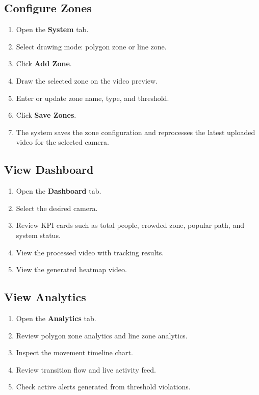 \documentclass[12pt,a4paper]{report}
\begin{document}
\subsection{Configure Zones}

\begin{enumerate}
    \item Open the \textbf{System} tab.
    \item Select drawing mode: polygon zone or line zone.
    \item Click \textbf{Add Zone}.
    \item Draw the selected zone on the video preview.
    \item Enter or update zone name, type, and threshold.
    \item Click \textbf{Save Zones}.
    \item The system saves the zone configuration and reprocesses the latest uploaded video for the selected camera.
\end{enumerate}

\subsection{View Dashboard}

\begin{enumerate}
    \item Open the \textbf{Dashboard} tab.
    \item Select the desired camera.
    \item Review KPI cards such as total people, crowded zone, popular path, and system status.
    \item View the processed video with tracking results.
    \item View the generated heatmap video.
\end{enumerate}

\subsection{View Analytics}

\begin{enumerate}
    \item Open the \textbf{Analytics} tab.
    \item Review polygon zone analytics and line zone analytics.
    \item Inspect the movement timeline chart.
    \item Review transition flow and live activity feed.
    \item Check active alerts generated from threshold violations.
\end{enumerate}
\end{document}
